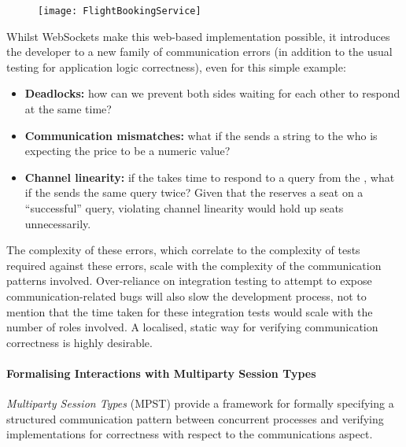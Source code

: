 \begin{figure}[!ht]
\centering
\texttt{[image: FlightBookingService]}
\label{fig:flightbook}
\end{figure}

Whilst WebSockets make this web-based implementation possible, 
it introduces the developer to a new family of communication errors
(in addition to the usual testing for application logic correctness), 
even for this simple example:

\begin{itemize}

\item
\textbf{Deadlocks:} how can we prevent both sides waiting for 
each other to respond at the same time?

\item 
\textbf{Communication mismatches:} what if the 
 sends a string to the 
who is expecting the price to be a numeric value?

\item
\textbf{Channel linearity:} if the 
takes time to respond to a query from the ,
what if the  sends the same query twice? 
Given that the  reserves a seat on
a ``successful'' query, violating channel linearity
would hold up seats unnecessarily.

\end{itemize}

The complexity of these errors,
which correlate to the complexity of tests 
required against these errors, 
scale with the complexity of the 
communication patterns involved. 
Over-reliance on integration testing
to attempt to expose communication-related bugs 
will also slow the
development process, not to mention that the time 
taken for these
integration tests would scale with the number of roles involved.
A localised, static way for verifying communication correctness
is highly desirable.

\paragraph{Formalising Interactions with
Multiparty Session Types}
\textit{Multiparty Session Types} (MPST) \cite{MPST} 
provide a framework for formally specifying 
a structured communication pattern 
between concurrent processes and 
verifying implementations for 
correctness with respect to the communications aspect. 

